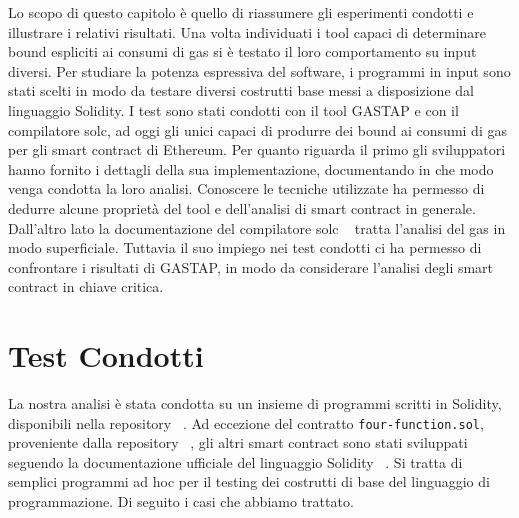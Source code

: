 
Lo scopo di questo capitolo è quello di riassumere gli esperimenti condotti e illustrare i relativi risultati.\newline
\indent Una volta individuati i tool capaci di determinare bound espliciti ai consumi di gas si è testato il loro comportamento su input diversi. Per studiare la potenza espressiva del software, i programmi in input sono stati scelti in modo da testare diversi costrutti base messi a disposizione dal linguaggio Solidity.\newline
\indent I test sono stati condotti con il tool GASTAP e con il compilatore solc, ad oggi gli unici capaci di produrre dei bound ai consumi di gas per gli smart contract di Ethereum. Per quanto riguarda il primo gli sviluppatori hanno fornito i dettagli della sua implementazione, documentando in che modo venga condotta la loro analisi. Conoscere le tecniche utilizzate ha permesso di dedurre alcune proprietà del tool e dell'analisi di smart contract in generale. Dall'altro lato la documentazione  del compilatore solc ~\cite{solidity-docs} tratta l'analisi del gas in modo superficiale. Tuttavia il suo impiego nei test condotti ci ha permesso di confrontare i risultati di GASTAP, in modo da considerare l'analisi degli smart contract in chiave critica.\newline

\newpage




    


\newpage

\section{Test Condotti}

La nostra analisi è stata condotta su un insieme di programmi scritti in Solidity, disponibili nella repository ~\cite{melastone-sc}.\newline
\indent Ad eccezione del contratto \verb|four-function.sol|, proveniente dalla repository ~\cite{ethir-repository}, gli altri smart contract sono stati sviluppati seguendo la documentazione ufficiale del linguaggio Solidity ~\cite{solidity-docs}. Si tratta di semplici programmi ad hoc per il testing dei costrutti di base del linguaggio di programmazione. Di seguito i casi che abbiamo trattato.\newline

    
